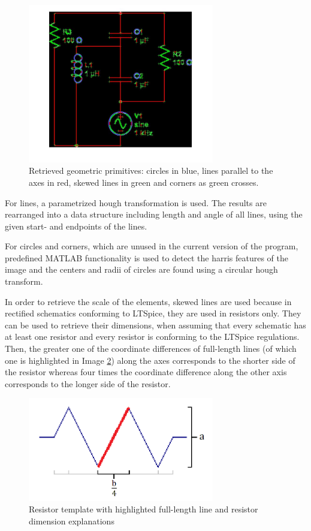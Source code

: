 \documentclass[10pt,twocolumn,letterpaper]{article}
\begin{document}
\begin{figure}[!ht]
\includegraphics[width = 3.2in]{img/geomprim.jpg}
\caption{Retrieved geometric primitives: circles in blue, lines parallel to the axes in red, skewed lines in green and corners as green crosses.}
\label{fig:c8}
\end{figure}
\par

For lines, a parametrized hough transformation is used. The results are rearranged into a data structure including length and angle of all lines, using the given start- and endpoints of the lines.
\par
For circles and corners, which are unused in the current version of the program, predefined MATLAB functionality is used to detect the harris features of the image and the centers and radii of circles are found using a circular hough transform.
\par
In order to retrieve the scale of the elements, skewed lines are used because in rectified schematics conforming to LTSpice, they are used in resistors only. They can be used to retrieve their dimensions, when assuming that every schematic has at least one resistor and every resistor is conforming to the LTSpice regulations. Then, the greater one of the coordinate differences of full-length lines (of which one is highlighted in Image \ref{fig:c9}) along the axes corresponds to the shorter side of the resistor whereas four times the coordinate difference along the other axis corresponds to the longer side of the resistor.
\par

\begin{figure}[!ht]
\includegraphics[width = 3.2in]{img/resdim.png}
\caption{Resistor template with highlighted full-length line and resistor dimension explanations}
\label{fig:c9}
\end{figure}
\end{document}

